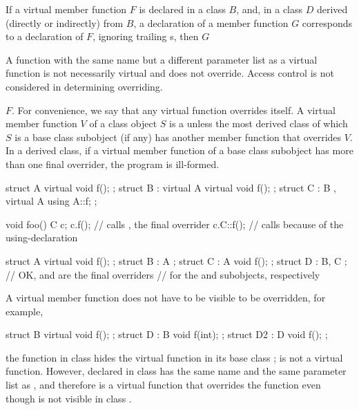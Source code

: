\pnum
If a virtual member function $F$ is declared in a class $B$, and,
in a class $D$ derived (directly or indirectly) from $B$,
a declaration of a member function $G$
corresponds to a declaration of $F$,
ignoring trailing s,
%
then $G$ 
\begin{footnote}
A function
with the same name but a different parameter list
as a virtual function is not necessarily virtual and
does not override. Access control is not considered in
determining overriding.
\end{footnote}
$F$.
For convenience, we say that any virtual function overrides itself.
%
A virtual member function $V$ of a class object $S$ is a  unless the most derived class of which $S$ is a
base class subobject (if any) has another member function that overrides $V$.
In a derived class, if a virtual member function of a base class subobject
has more than one final overrider, the program is ill-formed.
\begin{example}
\begin{codeblock}
struct A {
  virtual void f();
};
struct B : virtual A {
  virtual void f();
};
struct C : B , virtual A {
  using A::f;
};

void foo() {
  C c;
  c.f();            // calls , the final overrider
  c.C::f();         // calls  because of the using-declaration
}
\end{codeblock}
\end{example}

\begin{example}
\begin{codeblock}
struct A { virtual void f(); };
struct B : A { };
struct C : A { void f(); };
struct D : B, C { };            // OK,  and  are the final overriders
                                // for the  and  subobjects, respectively
\end{codeblock}
\end{example}

\pnum
\begin{note}
A virtual member function does not have to be visible to be overridden,
for example,
\begin{codeblock}
struct B {
  virtual void f();
};
struct D : B {
  void f(int);
};
struct D2 : D {
  void f();
};
\end{codeblock}
the function  in class  hides the virtual
function  in its base class ;  is
not a virtual function. However,  declared in class
 has the same name and the same parameter list as
, and therefore is a virtual function that overrides the
function  even though  is not visible in
class .
\end{note}

